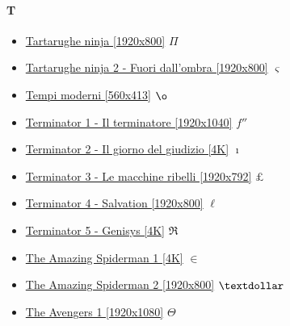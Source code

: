 	\paragraph{T} \hypertarget{FIT}{}
		\begin{itemize}
			
			\item \href{https://mega.nz/#!lLIWAJYS!wgFNQ39Lt97GygPb_nqVC1xrtrcXvp9Q6pcWEK1nfac} {Tartarughe ninja [1920x800]}  $\Pi$ \\
			\item \href{https://mega.nz/#!E2Z2zAZA!YVuPRTJ8KF-UqYrsIuQbH6y2OW9PTvkcSciwgPIP2zQ} {Tartarughe ninja 2 - Fuori dall'ombra [1920x800]}  $\varsigma$ \\
			\item \href{https://mega.nz/#!5oRiwKSA!kqc3Xiv5hRlrjt2cV-xT4I6JUht3V9kVV4fdSfHW2kQ} {Tempi moderni [560x413]}  $\o$ \\
			\item \href{https://mega.nz/#!DCxFGSDJ!DQz6zHloTyHIyjPVoVRm2FCpqh_sNICv6K_B0vNNO-c} {Terminator 1 - Il terminatore [1920x1040]}  $f''$ \\
			\item \href{https://mega.nz/#!LzBD0SDI!fIwHV_OJQdCfkBYRRBlFkUB04-xWaFbKwS6LnhrCWAc} {Terminator 2 - Il giorno del giudizio [4K]}  $\imath$ \\
			\item \href{https://mega.nz/#!y7YigYJJ!q_3J8GL9dN7WXyRqalmfANa-E1c3yFRetZyDrCmwXGw} {Terminator 3 - Le macchine ribelli [1920x792]}  $\pounds$ \\
			\item \href{https://mega.nz/#!3GYCHawI!FIf86gwoiUMQTev5FUQbGfEYpnvgmtxjkWL5D-GYrW4} {Terminator 4 - Salvation [1920x800]}  $\ell$ \\
			\item \href{https://mega.nz/#!XPQAVIqC!0oDS4_it147szgqwa1ZTYxXBzf6wLEgCoyP26RtrnTI} {Terminator 5 - Genisys [4K]}  $\Re$ \\
			\item \href{https://mega.nz/#!vKYmFKrJ!1LL8ryDPZmOtmXyOLR1kUjSn9qlelEtsceCWduRtals} {The Amazing Spiderman 1 [4K]}  $\in$ \\
			\item \href{https://mega.nz/#!v6w23L5a!B6az8aK_fRIZ42xXAPs2EFatXNlLvVeMCUS3oAhM29U} {The Amazing Spiderman 2 [1920x800]}  $\textdollar$ \\
			\item \href{https://mega.nz/#!6lRy1JJK!9hKRRnPzOQHKAS7qXkopo4nrIpjqhljSe0x_2YmKt-w} {The Avengers 1 [1920x1080]}  $\Theta$ \\

\end{itemize}

